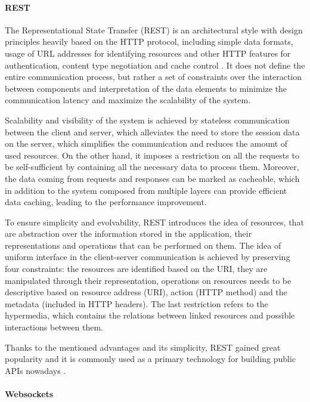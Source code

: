 \paragraph*{REST}

The Representational State Transfer (REST) is an architectural style with design principles heavily based on the HTTP protocol, including simple data formats, usage of URL addresses for identifying resources and other HTTP features for authentication, content type negotiation and cache control \cite{RESTPrincipledDesingOfModernWebArchitecture}. It does not define the entire communication process, but rather a set of constraints over the interaction between components and interpretation of the data elements to minimize the communication latency and maximize the scalability of the system.

Scalability and visibility of the system is achieved by stateless communication between the client and server, which alleviates the need to store the session data on the server, which simplifies the communication and reduces the amount of used resources. On the other hand, it imposes a restriction on all the requests to be self-sufficient by containing all the necessary data to process them. Moreover, the data coming from requests and responses can be marked as cacheable, which in addition to the system composed from multiple layers can provide efficient data caching, leading to the performance improvement.

To ensure simplicity and evolvability, REST introduces the idea of resources, that are abstraction over the information stored in the application, their representations and operations that can be performed on them.
The idea of uniform interface in the client-server communication is achieved by preserving four constraints: the resources are identified based on the URI, they are manipulated through their representation, operations on resources needs to be descriptive based on resource address (URI), action (HTTP method) and the metadata (included in HTTP headers). The last restriction refers to the hypermedia, which contains the relations between linked resources and possible interactions between them.

Thanks to the mentioned advantages and its simplicity, REST gained great popularity and it is commonly used as a primary technology for building public APIs nowadays \cite{APIDesignInDistributedSystems}.

\paragraph*{Websockets}

